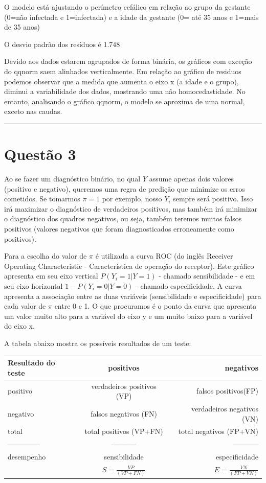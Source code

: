 \documentclass[11pt,]{article}
\begin{document}
O modelo está ajustando o perímetro cefálico em relação ao grupo da
gestante (0=não infectada e 1=infectada) e a idade da gestante (0= até
35 anos e 1=mais de 35 anos)

O desvio padrão dos resíduos é 1.748

Devido aos dados estarem agrupados de forma binária, os gráficos com
exceção do qqnorm saem alinhados verticalmente. Em relação ao gráfico de
residuos podemos observar que a medida que aumenta o eixo x (a idade e o
grupo), diminui a variabilidade dos dados, mostrando uma não
homocedastidade. No entanto, analisando o gráfico qqnorm, o modelo se
aproxima de uma normal, exceto nas caudas.

\begin{center}\rule{0.5\linewidth}{\linethickness}\end{center}

\section{Questão 3}\label{questao-3}

Ao se fazer um diagnóstico binário, no qual \(Y\) assume apenas dois
valores (positivo e negativo), queremos uma regra de predição que
minimize os erros cometidos. Se tomarmos \(\pi =1\) por exemplo, nosso
\(Y_{i}\) sempre será positivo. Isso irá maximizar o diagnóstico de
verdadeiros positivos, mas também irá minimizar o diagnóstico dos
quadros negativos, ou seja, também teremos muitos falsos positivos
(valores negativos que foram diagnosticados erroneamente como
positivos).

Para a escolha do valor de \(\pi\) é utilizada a curva ROC (do inglês
Receiver Operating Characteristic - Característica de operação do
receptor). Este gráfico apresenta em seu eixo vertical
\(P(Y_{i}=1|Y=1)\) - chamado sensibilidade - e em seu eixo horizontal
\(1-P(Y_{i}=0|Y=0)\) - chamado especificidade. A curva apresenta a
associação entre as duas variáveis (sensibilidade e especificidade) para
cada valor de \(\pi\) entre 0 e 1. O que procuramos é o ponto da curva
que apresenta um valor muito alto para a variável do eixo y e um muito
baixo para a variável do eixo x.

A tabela abaixo mostra os possíveis resultados de um teste:

\begin{longtable}[]{@{}lcr@{}}
\toprule
Resultado do teste & positivos & negativos\tabularnewline
\midrule
\endhead
positivo & verdadeiros positivos (VP) & falsos
positivos(FP)\tabularnewline
negativo & falsos negativos (FN) & verdadeiros negativos
(VN)\tabularnewline
total & total positivos (VP+FN) & total negativos (FP+VN)\tabularnewline
-------------- & ----------- & -----------\tabularnewline
desempenho & sensibilidade & especificidade\tabularnewline
& \(S= \frac{VP}{(VP+FN)}\) & \(E= \frac{VN}{(FP+VN)}\)\tabularnewline
\bottomrule
\end{longtable}
\end{document}
